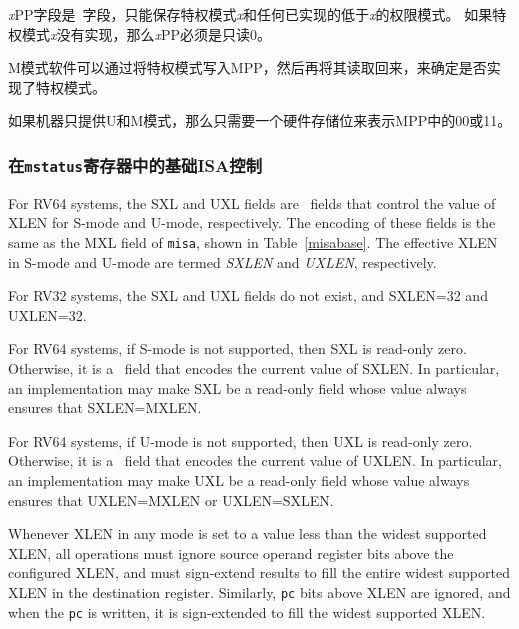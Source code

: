 {\em x}\/PP字段是\warl\ 字段，只能保存特权模式{\em x}和任何已实现的低于{\em x}的权限模式。
如果特权模式{\em x}没有实现，那么{\em x}\/PP必须是只读0。

\iffalse
\begin{commentary}
M-mode software can determine whether a privilege mode is implemented
by writing that mode to MPP then reading it back.

If the machine provides only U and M modes, then only a single
hardware storage bit is required to represent either 00 or 11 in MPP.
\end{commentary}
\fi

M模式软件可以通过将特权模式写入MPP，然后再将其读取回来，来确定是否实现了特权模式。

如果机器只提供U和M模式，那么只需要一个硬件存储位来表示MPP中的00或11。

\subsubsection{在{\tt mstatus}寄存器中的基础ISA控制}
\label{xlen-control}

\iffalse
For RV64 systems, the SXL and UXL fields are \warl\ fields
that control the value of XLEN for S-mode and U-mode,
respectively. The encoding of these fields is the same as the MXL
field of {\tt misa}, shown in Table~\ref{misabase}.  The effective
XLEN in S-mode and U-mode are termed {\em SXLEN} and {\em UXLEN},
respectively.

For RV32 systems, the SXL and UXL fields do not exist, and
SXLEN=32 and UXLEN=32.


For RV64 systems, if S-mode is not supported, then SXL is read-only
zero.  Otherwise, it is a \warl\ field that encodes the current value of
SXLEN.  In particular, an implementation may make SXL be a read-only
field whose value always ensures that SXLEN=MXLEN.

For RV64 systems, if U-mode is not supported, then UXL is read-only
zero.  Otherwise, it is a \warl\ field that encodes the current value of
UXLEN.  In particular, an implementation may make UXL be a read-only
field whose value always ensures that UXLEN=MXLEN or UXLEN=SXLEN.



Whenever XLEN in any mode is set to a value less than the widest
supported XLEN, all operations must ignore source operand register
bits above the configured XLEN, and must sign-extend results to fill
the entire widest supported XLEN in the destination register.
Similarly, {\tt pc} bits above XLEN are ignored, and when the {\tt pc}
is written, it is sign-extended to fill the widest supported XLEN.

